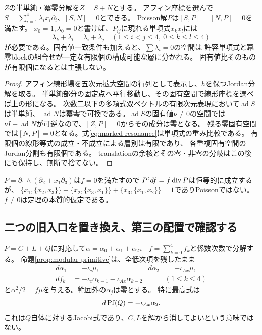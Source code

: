 \begin{proposition}[共通の有限共鳴層別]\label{prop:resonance}
$Z$の半単純・冪零分解を$Z=S+N$とする。
アフィン座標を選んで$S=\sum_{i=1}^4\lambda_i x_i\partial_i$、$[S,N]=0$とできる。
Poisson解$P$は$[S,P]=[N,P]=0$を満たす。
$x_0=1,\lambda_0=0$と書けば、$P_{ij}$に現れる単項式$x_kx_l$には
\begin{equation}
 \lambda_k+\lambda_l=\lambda_i+\lambda_j
 \quad(1\le i<j\le4,\ 0\le k\le l\le4)              \label{eq:marked-resonance}
\end{equation}
が必要である。固有値一致条件も加えると、$\sum\lambda_i=0$の空間は
許容単項式と冪零blockの組合せが一定な有限個の構成可能な層に分かれる。
固有値比そのものが有限個になるとは主張しない。
\end{proposition}
\begin{proof}
アフィン線形場を五次元拡大空間の行列として表示し、$h$を保つJordan分解を取る。
半単純部分の固定点へ平行移動し、その固有空間で線形座標を選べば上の形になる。
次数二以下の多項式双ベクトルの有限次元表現において$\operatorname{ad}S$は半単純、
$\operatorname{ad}N$は冪零で可換である。$\operatorname{ad}S$の固有値$\nu\ne0$の空間では
$\nu I+\operatorname{ad}N$が可逆なので、$[Z,P]=0$からその成分は零となる。
残る零固有空間では$[N,P]=0$となる。式\eqref{eq:marked-resonance}は単項式の重み比較である。
有限個の線形等式の成立・不成立による層別は有限であり、
各重複固有空間のJordan分割も有限個である。
translationの余核とその零・非零の分岐はこの後にも保持し、無断で捨てない。
\end{proof}

\begin{remark}[rank二での失敗を明示する]
$P=\partial_1\wedge(\partial_2+x_1\partial_3)$は$f=0$を満たすので
$P^\sharp df=f\operatorname{div} P$は恒等的に成立するが、
$\{x_1,\{x_2,x_3\}\}+\{x_2,\{x_3,x_1\}\}+\{x_3,\{x_1,x_2\}\}=1$でありPoissonではない。
$f\ne0$は定理の本質的仮定である。
\end{remark}

\subsection{二つの旧入口を置き換え、第三の配置で確認する}
$P=C+L+Q$に対応して$\alpha=\alpha_0+\alpha_1+\alpha_2$、
$f=\sum_{k=0}^4 f_k$と係数次数で分解する。
命題\ref{prop:modular-primitive}は、全低次項を残したまま
\begin{align}
 d\alpha_1&=-\iota_c\mu,&d\alpha_2&=-\iota_{Ax}\mu,\label{eq:degree-divergence}\\
 df_k&=-\iota_c\alpha_{k-1}-\iota_{Ax}\alpha_{k-2}
       &&(1\le k\le4)                              \label{eq:degree-primitive}
\end{align}
と$\alpha^2/2=f\mu$を与える。範囲外の$\alpha_j$は零とする。
特に最高式は
\begin{equation}
 d\operatorname{Pf}(Q)=-\iota_{Ax}\alpha_2.\label{eq:highest-primitive}
\end{equation}
これは$Q$自体に対するJacobi式であり、$C,L$を解から消してよいという意味ではない。

